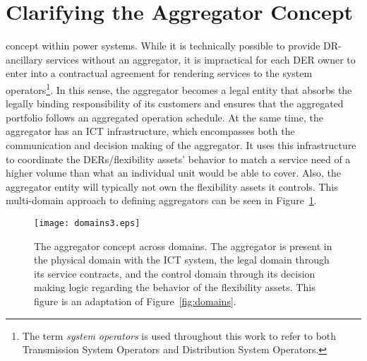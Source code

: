 \section{Clarifying the Aggregator Concept}
 concept within power systems. While it is technically possible to provide DR-ancillary services without an aggregator, it is impractical for each DER owner to enter into a contractual agreement for rendering services to the system operators\footnote{The term \emph{system operators} is used throughout this work to refer to both Transmission System Operators and Distribution System Operators.}. In this sense, the aggregator becomes a legal entity that absorbs the legally binding responsibility of its customers and ensures that the aggregated portfolio follows an aggregated operation schedule. At the same time, the aggregator has an ICT infrastructure, which encompasses both the communication and decision making of the aggregator. It uses this infrastructure to coordinate the DERs/flexibility assets' behavior to match a service need of a higher volume than what an individual unit would be able to cover. Also, the aggregator entity will typically not own the flexibility assets it controls. This multi-domain approach to defining aggregators can be seen in Figure~\ref{fig:MAINdomains}.

\begin{figure}[htbp!]
\centering
\texttt{[image: domains3.eps]}
\caption{The aggregator concept across domains. The aggregator is present in the physical domain with the ICT system, the legal domain through its service contracts, and the control domain through its decision making logic regarding the behavior of the flexibility assets. This figure is an adaptation of Figure~\ref{fig:domains}.}
\label{fig:MAINdomains}
\end{figure}

